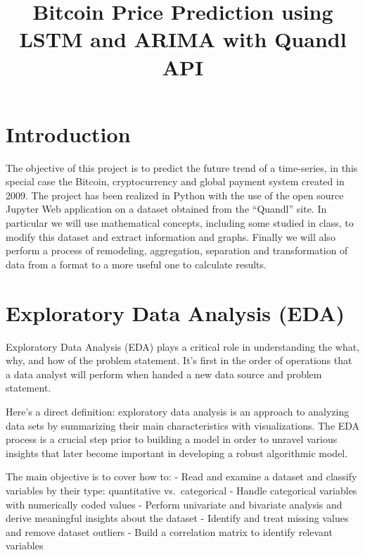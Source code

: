 \documentclass[11pt]{article}
\title{Bitcoin Price Prediction using LSTM and ARIMA with Quandl API}
\begin{document}
    
    
    \maketitle
    
    

    
    \hypertarget{introduction}{%
\section{Introduction}\label{introduction}}

    The objective of this project is to predict the future trend of a
time-series, in this special case the Bitcoin, cryptocurrency and global
payment system created in 2009. The project has been realized in Python
with the use of the open source Jupyter Web application on a dataset
obtained from the ``Quandl'' site. In particular we will use
mathematical concepts, including some studied in class, to modify this
dataset and extract information and graphs. Finally we will also perform
a process of remodeling, aggregation, separation and transformation of
data from a format to a more useful one to calculate results.

    \hypertarget{exploratory-data-analysis-eda}{%
\section{Exploratory Data Analysis
(EDA)}\label{exploratory-data-analysis-eda}}

    Exploratory Data Analysis (EDA) plays a critical role in understanding
the what, why, and how of the problem statement. It's first in the order
of operations that a data analyst will perform when handed a new data
source and problem statement.

    Here's a direct definition: exploratory data analysis is an approach to
analyzing data sets by summarizing their main characteristics with
visualizations. The EDA process is a crucial step prior to building a
model in order to unravel various insights that later become important
in developing a robust algorithmic model.

    The main objective is to cover how to: - Read and examine a dataset and
classify variables by their type: quantitative vs.~categorical - Handle
categorical variables with numerically coded values - Perform univariate
and bivariate analysis and derive meaningful insights about the dataset
- Identify and treat missing values and remove dataset outliers - Build
a correlation matrix to identify relevant variables
\end{document}
